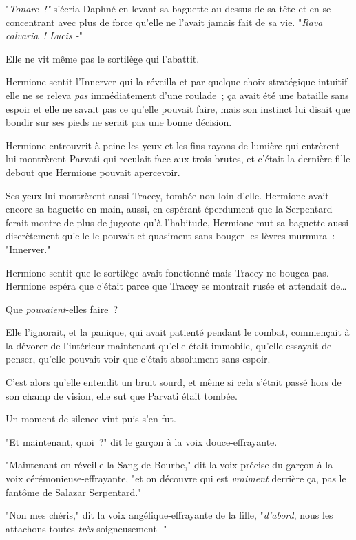 "\emph{Tonare~!"} s'écria Daphné en levant sa baguette au-dessus de sa tête et en se concentrant avec plus de force qu'elle ne l'avait jamais fait de sa vie. "\emph{Rava calvaria~! Lucis -}"

Elle ne vit même pas le sortilège qui l'abattit.

\later

Hermione sentit l'Innerver qui la réveilla et par quelque choix stratégique intuitif elle ne se releva \emph{pas} immédiatement d'une roulade~; ça avait été une bataille sans espoir et elle ne savait pas ce qu'elle pouvait faire, mais son instinct lui disait que bondir sur ses pieds ne serait pas une bonne décision.

Hermione entrouvrit à peine les yeux et les fins rayons de lumière qui entrèrent lui montrèrent Parvati qui reculait face aux trois brutes, et c'était la dernière fille debout que Hermione pouvait apercevoir.

Ses yeux lui montrèrent aussi Tracey, tombée non loin d'elle. Hermione avait encore sa baguette en main, aussi, en espérant éperdument que la Serpentard ferait montre de plus de jugeote qu'à l'habitude, Hermione mut sa baguette aussi discrètement qu'elle le pouvait et quasiment sans bouger les lèvres murmura~: "Innerver."

Hermione sentit que le sortilège avait fonctionné mais Tracey ne bougea pas. Hermione espéra que c'était parce que Tracey se montrait rusée et attendait de…

Que \emph{pouvaient}-elles faire~?

Elle l'ignorait, et la panique, qui avait patienté pendant le combat, commençait à la dévorer de l'intérieur maintenant qu'elle était immobile, qu'elle essayait de penser, qu'elle pouvait voir que c'était absolument sans espoir.

C'est alors qu'elle entendit un bruit sourd, et même si cela s'était passé hors de son champ de vision, elle sut que Parvati était tombée.

Un moment de silence vint puis s'en fut.

"Et maintenant, quoi~?" dit le garçon à la voix douce-effrayante.

"Maintenant on réveille la Sang-de-Bourbe," dit la voix précise du garçon à la voix cérémonieuse-effrayante, "et on découvre qui est \emph{vraiment} derrière ça, pas le fantôme de Salazar Serpentard."

"Non mes chéris," dit la voix angélique-effrayante de la fille, "\emph{d'abord}, nous les attachons toutes \emph{très} soigneusement -"

